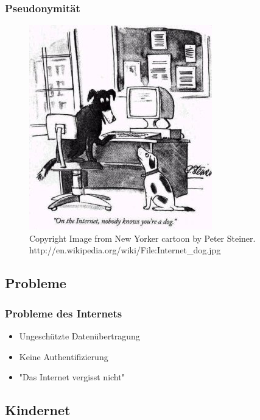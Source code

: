 \documentclass{beamer}
\begin{document}
\begin{frame}
  \frametitle{Pseudonymität}
  \begin{figure}
    \includegraphics[height=0.7\textheight]{img/internet_dog.jpg}
    \caption{Copyright Image from New Yorker cartoon by Peter Steiner. http://en.wikipedia.org/wiki/File:Internet\_dog.jpg}
  \end{figure}
\end{frame}

\subsection{Probleme}

\begin{frame}
  \frametitle{Probleme des Internets}
  \begin{itemize}
    \item<2-> Ungeschützte Datenübertragung
    \item<3-> Keine Authentifizierung
    \item<4-> "Das Internet vergisst nicht"
  \end{itemize}
\end{frame}

\subsection{Kindernet}
\end{document}
